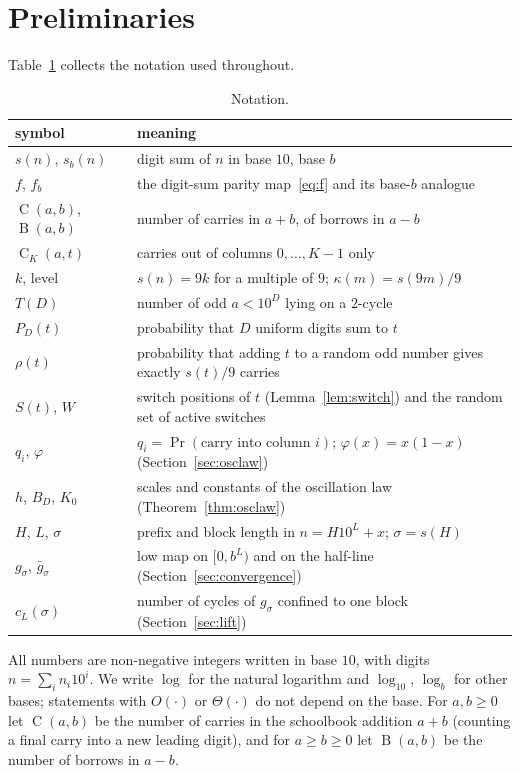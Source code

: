 \documentclass[11pt]{article}
\theoremstyle{definition}
\theoremstyle{remark}
\newcommand{\C}{\operatorname{C}}
\newcommand{\B}{\operatorname{B}}
\begin{document}
\section{Preliminaries}

Table~\ref{tab:notation} collects the notation used throughout.

\begin{table}[h]
\centering
\small
\begin{tabular}{>{\raggedright}p{2.9cm}>{\raggedright\arraybackslash}p{9.9cm}}
\toprule
symbol & meaning\\
\midrule
$s(n)$, $s_b(n)$ & digit sum of $n$ in base $10$, base $b$\\
$f$, $f_b$ & the digit-sum parity map~\eqref{eq:f} and its base-$b$ analogue\\
$\C(a,b)$, $\B(a,b)$ & number of carries in $a+b$, of borrows in $a-b$\\
$\C_K(a,t)$ & carries out of columns $0,\dots,K-1$ only\\
$k$, level & $s(n)=9k$ for a multiple of $9$; $\kappa(m)=s(9m)/9$\\
$T(D)$ & number of odd $a<10^D$ lying on a $2$-cycle\\
$P_D(t)$ & probability that $D$ uniform digits sum to $t$\\
$\rho(t)$ & probability that adding $t$ to a random odd number gives exactly $s(t)/9$ carries\\
$S(t)$, $W$ & switch positions of $t$ (Lemma~\ref{lem:switch}) and the random set of active switches\\
$q_i$, $\varphi$ & $q_i=\Pr(\text{carry into column }i)$; $\varphi(x)=x(1-x)$ (Section~\ref{sec:osclaw})\\
$h$, $B_D$, $K_0$ & scales and constants of the oscillation law (Theorem~\ref{thm:osclaw})\\
$H$, $L$, $\sigma$ & prefix and block length in $n=H10^L+x$; $\sigma=s(H)$\\
$g_\sigma$, $\bar g_\sigma$ & low map on $[0,b^L)$ and on the half-line (Section~\ref{sec:convergence})\\
$c_L(\sigma)$ & number of cycles of $g_\sigma$ confined to one block (Section~\ref{sec:lift})\\
\bottomrule
\end{tabular}
\caption{Notation.}\label{tab:notation}
\end{table}

All numbers are non-negative integers written in base $10$, with digits
$n=\sum_i n_i10^i$. We write $\log$ for the natural logarithm and $\log_{10}$,
$\log_b$ for other bases; statements with $O(\cdot)$ or $\Theta(\cdot)$ do not
depend on the base. For $a,b\ge0$ let $\C(a,b)$ be the number of carries in
the schoolbook addition $a+b$ (counting a final carry into a new leading
digit), and for $a\ge b\ge0$ let $\B(a,b)$ be the number of borrows in $a-b$.
\end{document}
